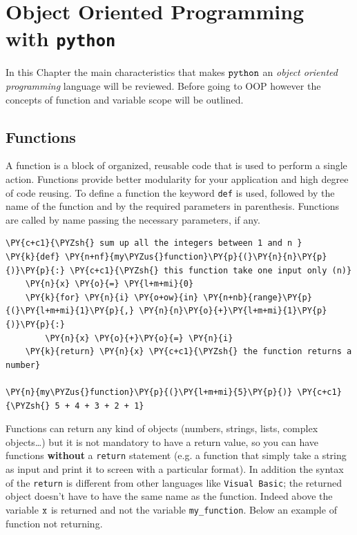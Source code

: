 \chapter{Object Oriented Programming with \texttt{python}}\label{introduction-to-python---lesson-2}

In this Chapter the main characteristics that makes $\tt{python}$ an \textit{object oriented programming} language will be reviewed.
Before going to OOP however the concepts of function and variable scope will be outlined.

\section{Functions}\label{functions}

A function is a block of organized, reusable code that is used to perform a single action. 
Functions provide better modularity for your application and high degree of code reusing.
To define a function the keyword \texttt{def} is used, followed by the name of the function 
and by the required parameters in parenthesis. 
Functions are called by name passing the necessary parameters, if any.

\begin{codebox}
\begin{Verbatim}[commandchars=\\\{\}]
\PY{c+c1}{\PYZsh{} sum up all the integers between 1 and n }
\PY{k}{def} \PY{n+nf}{my\PYZus{}function}\PY{p}{(}\PY{n}{n}\PY{p}{)}\PY{p}{:} \PY{c+c1}{\PYZsh{} this function take one input only (n)}
    \PY{n}{x} \PY{o}{=} \PY{l+m+mi}{0}
    \PY{k}{for} \PY{n}{i} \PY{o+ow}{in} \PY{n+nb}{range}\PY{p}{(}\PY{l+m+mi}{1}\PY{p}{,} \PY{n}{n}\PY{o}{+}\PY{l+m+mi}{1}\PY{p}{)}\PY{p}{:}
        \PY{n}{x} \PY{o}{+}\PY{o}{=} \PY{n}{i}
    \PY{k}{return} \PY{n}{x} \PY{c+c1}{\PYZsh{} the function returns a number}

\PY{n}{my\PYZus{}function}\PY{p}{(}\PY{l+m+mi}{5}\PY{p}{)} \PY{c+c1}{\PYZsh{} 5 + 4 + 3 + 2 + 1}
\end{Verbatim}
\end{codebox}

Functions can return any kind of objects (numbers, strings, lists, complex objects\ldots) 
but it is not mandatory to have a return value, so you can have functions \textbf{without} 
a \texttt{return} statement (e.g. a function that simply take a string as input and print it 
to screen with a particular format).
In addition the syntax of the \texttt{return} is different from other languages like 
\texttt{Visual\ Basic}; the returned object doesn't have to have the same name as the function. 
Indeed above the variable $\tt{x}$ is returned and not the variable \texttt{my\_function}. 
Below an example of function not returning.

